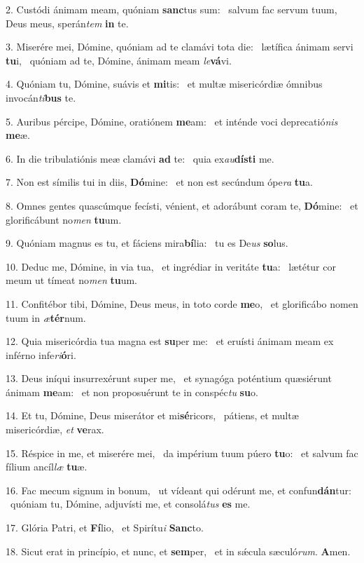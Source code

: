 2. Custódi ánimam meam, quóniam \textbf{sanc}tus sum: \ast\  salvum fac servum tuum, Deus meus, sperán\textit{tem} \textbf{in} te.\

3. Miserére mei, Dómine, quóniam ad te clamávi tota die: \dag\  lætífica ánimam servi \textbf{tu}i, \ast\  quóniam ad te, Dómine, ánimam meam \textit{le}\textbf{vá}vi.\

4. Quóniam tu, Dómine, suávis et \textbf{mi}tis: \ast\  et multæ misericórdiæ ómnibus invocán\textit{ti}\textbf{bus} te.\

5. Auribus pércipe, Dómine, oratiónem \textbf{me}am: \ast\  et inténde voci deprecatió\textit{nis} \textbf{me}æ.\

6. In die tribulatiónis meæ clamávi \textbf{ad} te: \ast\  quia ex\textit{au}\textbf{dís}\textbf{ti} me.\

7. Non est símilis tui in diis, \textbf{Dó}mine: \ast\  et non est secúndum ópe\textit{ra} \textbf{tu}a.\

8. Omnes gentes quascúmque fecísti, vénient, et adorábunt coram te, \textbf{Dó}mine: \ast\  et glorificábunt no\textit{men} \textbf{tu}um.\

9. Quóniam magnus es tu, et fáciens mira\textbf{bí}lia: \ast\  tu es De\textit{us} \textbf{so}lus.\

10. Deduc me, Dómine, in via tua, \dag\  et ingrédiar in veritáte \textbf{tu}a: \ast\  lætétur cor meum ut tímeat no\textit{men} \textbf{tu}um.\

11. Confitébor tibi, Dómine, Deus meus, in toto corde \textbf{me}o, \ast\  et glorificábo nomen tuum in \textit{æ}\textbf{tér}num.\

12. Quia misericórdia tua magna est \textbf{su}per me: \ast\  et eruísti ánimam meam ex inférno infe\textit{ri}\textbf{ó}ri.\

13. Deus iníqui insurrexérunt super me, \dag\  et synagóga poténtium quæsiérunt ánimam \textbf{me}am: \ast\  et non proposuérunt te in conspéc\textit{tu} \textbf{su}o.\

14. Et tu, Dómine, Deus miserátor et mi\textbf{sé}ricors, \ast\  pátiens, et multæ misericórdiæ, \textit{et} \textbf{ve}rax.\

15. Réspice in me, et miserére mei, \dag\  da impérium tuum púero \textbf{tu}o: \ast\  et salvum fac fílium ancíl\textit{læ} \textbf{tu}æ.\

16. Fac mecum signum in bonum, \dag\  ut vídeant qui odérunt me, et confun\textbf{dán}tur: \ast\  quóniam tu, Dómine, adjuvísti me, et consolá\textit{tus} \textbf{es} me.\

17. Glória Patri, et \textbf{Fí}lio, \ast\  et Spirítu\textit{i} \textbf{Sanc}to.\

18. Sicut erat in princípio, et nunc, et \textbf{sem}per, \ast\  et in sǽcula sæculó\textit{rum}. \textbf{A}men.\

